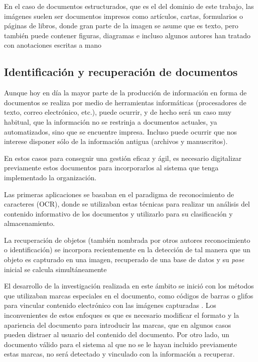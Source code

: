 En el caso de documentos estructurados, que es el del dominio de este trabajo, las imágenes suelen ser documentos impresos como artículos, cartas, formularios o páginas de libros, donde gran parte de la imagen se asume que es texto, pero también puede contener figuras, diagramas e incluso algunos autores han tratado con anotaciones escritas a mano \cite{Chen}

\subsection{Identificación y recuperación de documentos}
Aunque hoy en día la mayor parte de la producción de información en forma de documentos se realiza por medio de herramientas informáticas (procesadores de texto, correo electrónico, etc.), puede ocurrir, y de hecho será un caso muy habitual, que la información no se restrinja a documentos actuales, ya automatizados, sino que se encuentre impresa. Incluso puede ocurrir que nos interese disponer sólo de la información antigua (archivos y manuscritos).

En estos casos para conseguir una gestión eficaz y ágil, es necesario digitalizar previamente estos documentos para incorporarlos al sistema que tenga implementado la organización.

Las primeras aplicaciones se basaban en el paradigma de reconocimiento de caracteres (\acs{OCR}), donde se utilizaban estas técnicas para realizar un análisis del contenido informativo de los documentos y utilizarlo para su clasificación y almacenamiento. 

La recuperación de objetos (también nombrada por otros autores reconocimiento o identificación) se incorpora recientemente en la detección de tal manera que un objeto es capturado en una imagen, recuperado de una base de datos y su \textit{pose} inicial se calcula simultáneamente \cite{Pilet}

El desarrollo de la investigación realizada en este ámbito se inició con los métodos que utilizaban marcas especiales en el documento, como códigos de barras \cite{Graham} o glifos para vincular contenido electrónico con las imágenes capturadas \cite{Hecht}. Los inconvenientes de estos enfoques es que es necesario modificar el formato y la apariencia del documento para introducir las marcas, que en algunos casos pueden distraer al usuario del contenido del documento. Por otro lado, un documento válido para el sistema al que no se le hayan incluido previamente estas marcas, no será detectado y vinculado con la información a recuperar.

